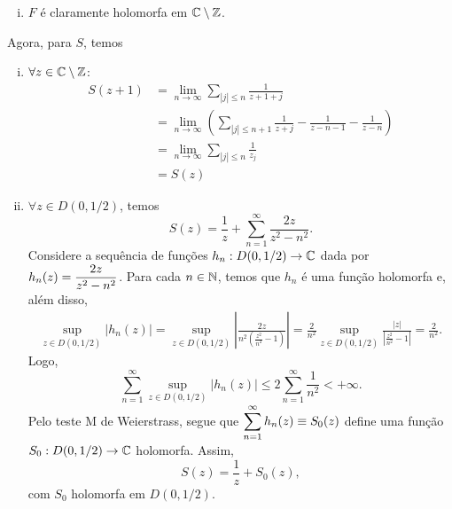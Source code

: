 \begin{exemplo}
\begin{enumerate}[(i)]
            \item $F$ é claramente holomorfa em $\mathbb{C}\setminus\mathbb{Z}$.
        \end{enumerate}
        Agora, para $S$, temos
        \begin{enumerate}[(i)]
            \item $\forall z\in\mathbb{C}\setminus\mathbb{Z}$:
            \begin{align*}
                S(z+1) &= \lim_{n\to\infty} \sum_{|j|\leq n} \frac{1}{z+1+j} \\
                       &= \lim_{n\to\infty}\left( \sum_{|j|\leq n+1} \frac{1}{z+j}
                       - \frac{1}{z-n-1} - \frac{1}{z-n} \right) \\
                       &= \lim_{n\to\infty} \sum_{|j|\leq n} \frac{1}{z_j} \\
                       &= S(z)
            \end{align*}
            \item $\forall z\in D(0,1/2)$, temos
            \begin{equation*}
                S(z) = \frac{1}{z} + \sum_{n=1}^{\infty} \frac{2z}{z^2 - n^2}.
            \end{equation*}
            Considere a sequência de funções $h_n:D(0,1/2)\to\mathbb{C}$ dada por
            $h_n(z) = \displaystyle{ \frac{2z}{z^2 - n^2} }$. Para cada $n\in\mathbb{N}$, temos
            que $h_n$ é uma função holomorfa e, além disso,
            \begin{align*}
                \sup_{z\in D(0,1/2)} |h_n(z)| 
                = \sup_{z\in D(0,1/2)} \left| \frac{2z}{n^2
                \left( \frac{z^2}{n^2} - 1 \right)} \right|
                = \frac{2}{n^2}\sup_{z\in D(0,1/2)} 
                \frac{|z|}{\left| \frac{z^2}{n^2} - 1 \right|}
                = \frac{2}{n^2}.
            \end{align*}
            Logo,
            \begin{equation*}
                \sum_{n=1}^{\infty} \sup_{z\in D(0,1/2)} |h_n(z)|
                \leq 2\sum_{n=1}^{\infty} \frac{1}{n^2} < +\infty.
            \end{equation*}
            Pelo teste M de Weierstrass, segue que 
            $\displaystyle{ \sum_{n=1}^{\infty} h_n(z) \equiv S_0(z) }$ define uma função
            $S_0: D(0,1/2) \to\mathbb{C}$ holomorfa. Assim, 
            \begin{equation*}
                S(z) = \frac{1}{z} + S_0(z),
            \end{equation*}
            com $S_0$ holomorfa em $D(0,1/2)$.
            

\end{enumerate}
\end{exemplo}
